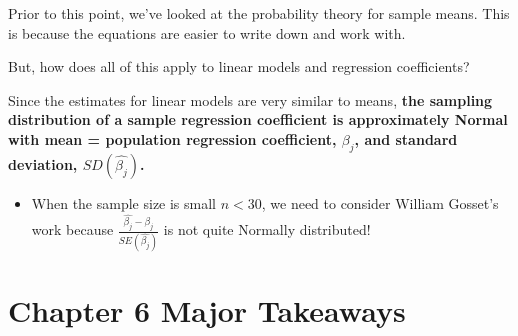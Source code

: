 \documentclass[
]{book}
\providecommand{\tightlist}{%
  \setlength{\itemsep}{0pt}\setlength{\parskip}{0pt}}
\begin{document}
Prior to this point, we've looked at the probability theory for sample means. This is because the equations are easier to write down and work with.

But, how does all of this apply to linear models and regression coefficients?

Since the estimates for linear models are very similar to means, \textbf{the sampling distribution of a sample regression coefficient is approximately Normal with mean = population regression coefficient, \(\beta_j\), and standard deviation, \(SD(\hat{\beta_j})\). }

\begin{itemize}
\tightlist
\item
  When the sample size is small \(n<30\), we need to consider William Gosset's work because \(\frac{\hat{\beta_j} - \beta_j}{SE(\hat{\beta_j})}\) is not quite Normally distributed!
\end{itemize}

\section{Chapter 6 Major Takeaways}\label{chapter-6-major-takeaways}
\end{document}
